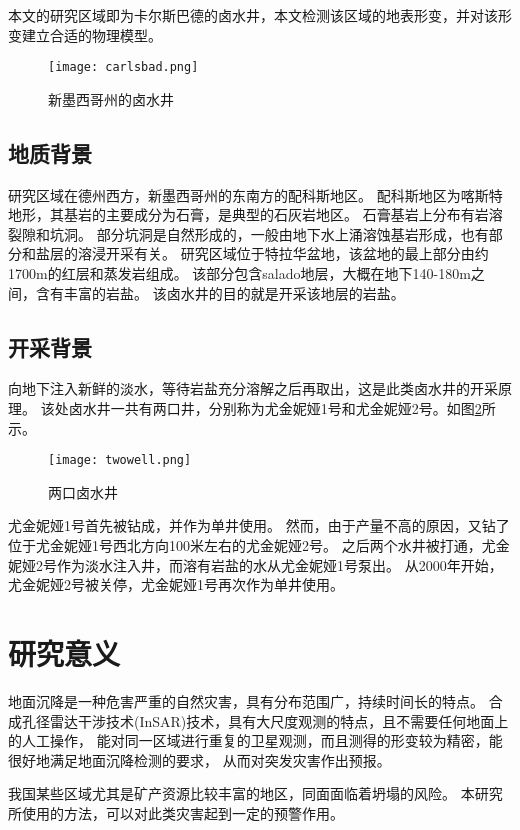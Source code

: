 本文的研究区域即为卡尔斯巴德的卤水井，本文检测该区域的地表形变，并对该形变建立合适的物理模型。
\begin{figure}[htb]
  \centering
  \texttt{[image: carlsbad.png]}
  \caption{新墨西哥州的卤水井}
  \label{fig:carlsbad}
\end{figure}

\subsection{地质背景}
研究区域在德州西方，新墨西哥州的东南方的配科斯地区。
配科斯地区为喀斯特地形，其基岩的主要成分为石膏，是典型的石灰岩地区。
石膏基岩上分布有岩溶裂隙和坑洞。
部分坑洞是自然形成的，一般由地下水上涌溶蚀基岩形成，也有部分和盐层的溶浸开采有关。
研究区域位于特拉华盆地，该盆地的最上部分由约1700m的红层和蒸发岩组成。
该部分包含salado地层，大概在地下140-180m之间，含有丰富的岩盐。
该卤水井的目的就是开采该地层的岩盐。

\subsection{开采背景}
向地下注入新鲜的淡水，等待岩盐充分溶解之后再取出，这是此类卤水井的开采原理。
该处卤水井一共有两口井，分别称为尤金妮娅1号和尤金妮娅2号。如图\ref{fig:twowell}所示。
\begin{figure}[htp]
  \centering
  \texttt{[image: twowell.png]}
  \caption{两口卤水井}
  \label{fig:twowell}
\end{figure}
尤金妮娅1号首先被钻成，并作为单井使用。
然而，由于产量不高的原因，又钻了位于尤金妮娅1号西北方向100米左右的尤金妮娅2号。
之后两个水井被打通，尤金妮娅2号作为淡水注入井，而溶有岩盐的水从尤金妮娅1号泵出。
从2000年开始，尤金妮娅2号被关停，尤金妮娅1号再次作为单井使用。

\section{研究意义}
地面沉降是一种危害严重的自然灾害，具有分布范围广，持续时间长的特点。
合成孔径雷达干涉技术(InSAR)技术，具有大尺度观测的特点，且不需要任何地面上的人工操作，
能对同一区域进行重复的卫星观测，而且测得的形变较为精密，能很好地满足地面沉降检测的要求，
从而对突发灾害作出预报。

我国某些区域尤其是矿产资源比较丰富的地区，同面面临着坍塌的风险。
本研究所使用的方法，可以对此类灾害起到一定的预警作用。

